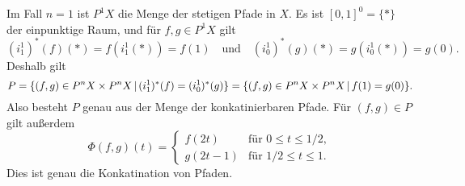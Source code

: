 Im Fall $n = 1$ ist $P^1 X$ die Menge der stetigen Pfade in $X$.
Es ist $[0,1]^0 = \{*\}$ der einpunktige Raum, und für $f, g \in P^1 X$ gilt
\[
    (i_1^1)^*(f)(*)
  = f(i_1^1(*))
  = f(1)
  \quad\text{und}\quad
    (i_0^1)^*(g)(*)
  = g(i_0^1(*))
  = g(0).
\]
Deshalb gilt
\[
    P
  = \{
      (f,g) \in P^n X \times P^n X
    \,|\,
      (i_1^1)^*(f) = (i_0^1)^*(g)
    \}
  = \{
      (f,g) \in P^n X \times P^n X
    \,|\,
      f(1) = g(0)
    \}.
\]
Also besteht $P$ genau aus der Menge der konkatinierbaren Pfade.
Für $(f,g) \in P$ gilt außerdem
\[
    \Phi(f,g)(t)
  = \begin{cases}
      f(2t)   & \text{für $0 \leq t \leq 1/2$}, \\
      g(2t-1) & \text{für $1/2 \leq t \leq 1$}.
    \end{cases}
\]
Dies ist genau die Konkatination von Pfaden.




